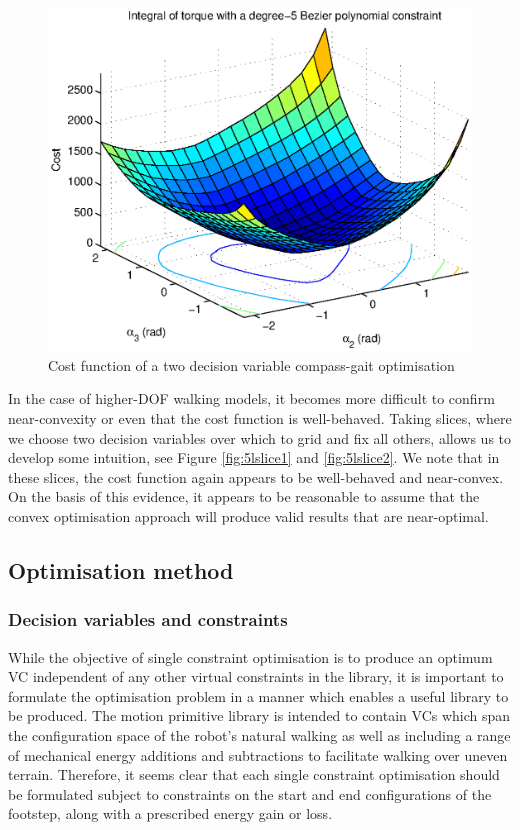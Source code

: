 \begin{figure}
	\centering
	\includegraphics[width=0.8\linewidth]{4VirtConstLib/CGgrid.eps}
	\caption{Cost function of a two decision variable compass-gait optimisation}
	\label{fig:cggridtorque}
\end{figure}

In the case of higher-DOF walking models, it becomes more difficult to confirm near-convexity or even that the cost function is well-behaved. Taking slices, where we choose two decision variables over which to grid and fix all others, allows us to develop some intuition, see Figure \ref{fig:5lslice1} and \ref{fig:5lslice2}. We note that in these slices, the cost function again appears to be well-behaved and near-convex. On the basis of this evidence, it appears to be reasonable to assume that the convex optimisation approach will produce valid results that are near-optimal.

\subsection{Optimisation method}
\subsubsection{Decision variables and constraints}
While the objective of single constraint optimisation is to produce an optimum VC independent of any other virtual constraints in the library, it is important to formulate the optimisation problem in a manner which enables a useful library to be produced. The motion primitive library is intended to contain VCs which span the configuration space of the robot's natural walking as well as including a range of mechanical energy additions and subtractions to facilitate walking over uneven terrain. Therefore, it seems clear that each single constraint optimisation should be formulated subject to constraints on the start and end configurations of the footstep, along with a prescribed energy gain or loss.

